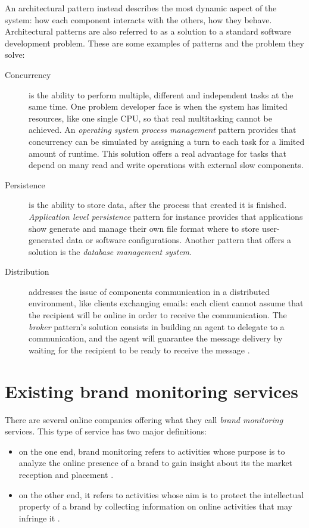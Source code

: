 An architectural pattern instead describes the most dynamic aspect of the
system: how each component interacts with the others, how they behave.
Architectural patterns are also referred to as a solution to a standard software
development problem. These are some examples of patterns and the problem they
solve:
\begin{description}
\item[Concurrency] is the ability to perform multiple, different and
independent tasks at the same time. One problem developer face is when the
system has limited resources, like one single CPU, so that real multitasking
cannot be achieved. An \emph{operating system process management} pattern
provides that concurrency can be simulated by assigning a turn to each task for
a limited amount of runtime. This solution offers a real advantage for tasks
that depend on many read and write operations with external slow components.
\item[Persistence] is the ability to store data, after the process that created
it is finished. \emph{Application level persistence} pattern for instance
provides that applications show generate and manage their own file format where
to store user-generated data or software configurations. Another pattern that
offers a solution is the \emph{database management system}.
\item[Distribution] addresses the issue of components communication in a
distributed environment, like clients exchanging emails: each client cannot
assume that the recipient will be online in order to receive the communication.
The \emph{broker} pattern's solution consists in building an agent to delegate
to a communication, and the agent will guarantee the message delivery by waiting
for the recipient to be ready to receive the message \cite{JB00}.
\end{description}

\section{Existing brand monitoring services}
There are several  online companies offering what they call \emph{brand
monitoring} services. This type of service has two major definitions:
\begin{itemize}
  \item on the one end, brand monitoring refers to activities whose purpose is
  to analyze the online presence of a brand to gain insight about its the market
  reception and placement \cite{techpd}.
  \item on the other end, it refers to activities whose aim is to protect the
  intellectual property of a brand by collecting information on online
  activities that may infringe it \cite{cscbrand}.
\end{itemize}

